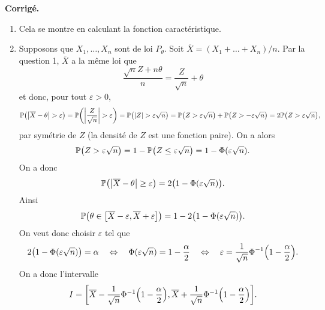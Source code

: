 \documentclass[a4paper,11pt]{article}
\let\originalleft\left
\let\originalright\right
\renewcommand{\left}{\mathopen{}\mathclose\bgroup\originalleft}
\renewcommand{\right}{\aftergroup\egroup\originalright}
\newcommand{\1}{\mathbbm{1}}
\newcommand{\Pp}[1]{\mathbb{P} \left(#1\right)}
\newcommand{\abs}[1]{\left\lvert#1\right\rvert}
\newcommand{\DSB}[1]{{\color{DarkSlateBlue}#1}}
\theoremstyle{plain}
\theoremstyle{definition}
\newcounter{exo}
\newcommand{\separationexos}{
	\bigskip
	}
\renewenvironment{comment}{\medskip\noindent \textcolor{BrickRed}{\textbf{Corrigé.}}}{}
\begin{document}
\begin{comment}
\begin{enumerate}
	\item Cela se montre en calculant la fonction caractéristique.
	\item Supposons que $X_1,\dots,X_n$ sont de loi $P_\theta$.
	Soit $\overline{X} = (X_1 + \dots + X_n)/n$. Par la question 1, $\overline{X}$ a la même loi que 
	\[
		\frac{\sqrt{n}Z+n\theta}{n} 
		= \frac{Z}{\sqrt{n}}  + \theta
	\]
	et donc, pour tout $\varepsilon > 0$,
	\[
	\Pp{\abs{\overline{X} - \theta} > \varepsilon}
	= \Pp{\abs{\frac{Z}{\sqrt{n}}} > \varepsilon}
	= \Pp{\abs{Z} > \varepsilon \sqrt{n}}
	= \Pp{Z > \varepsilon \sqrt{n}} + \Pp{Z > -\varepsilon \sqrt{n}}
	= 2 \Pp{Z > \varepsilon \sqrt{n}},
	\]
	par symétrie de $Z$ (la densité de $Z$ est une fonction paire).
	On a alors 
	\[
	\Pp{Z > \varepsilon \sqrt{n}} 
	= 1 - \Pp{Z \leq \varepsilon \sqrt{n}} 
	= 1 - \Phi(\varepsilon \sqrt{n}).
	\]
	On a donc 
	\[
	\Pp{\abs{\overline{X} - \theta} \geq \varepsilon}
	= 2 \left( 1 - \Phi(\varepsilon \sqrt{n}) \right).
	\]
	Ainsi
	\[
	\Pp{\theta \in \left[ \overline{X}-\varepsilon,\overline{X}+\varepsilon \right]}
	= 1 - 2 \left( 1 - \Phi(\varepsilon \sqrt{n}) \right).
	\]
	On veut donc choisir $\varepsilon$ tel que 
	\[
	2 \left( 1 - \Phi(\varepsilon \sqrt{n}) \right) = \alpha 
	\quad \Leftrightarrow \quad 
	\Phi(\varepsilon \sqrt{n}) = 1 - \frac{\alpha}{2}
	\quad \Leftrightarrow \quad
	\varepsilon = \frac{1}{\sqrt{n}} \Phi^{-1} \left( 1 - \frac{\alpha}{2} \right).
	\]
	On a donc l'intervalle 
	\[
		I = \left[ \overline{X} - \frac{1}{\sqrt{n}} \Phi^{-1} \left( 1 - \frac{\alpha}{2} \right),\overline{X} + \frac{1}{\sqrt{n}} \Phi^{-1} \left( 1 - \frac{\alpha}{2} \right) \right].
	\]
\end{enumerate}
\end{comment}


\separationexos
\end{document}
